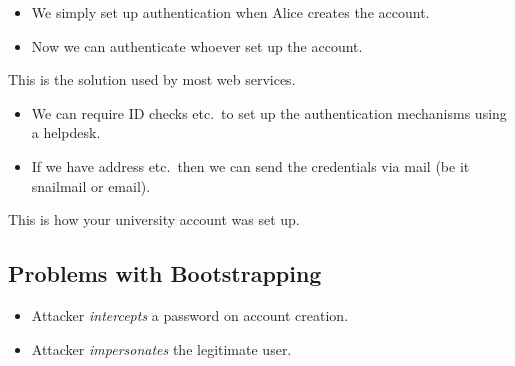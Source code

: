 \documentclass{beamer}
\begin{document}
\begin{frame}
  \begin{solution}
    \begin{itemize}
      \item We simply set up authentication when Alice creates the account.
      \item Now we can authenticate whoever set up the account.
    \end{itemize}
  \end{solution}

  \pause{}

  \begin{example}
    This is the solution used by most web services.
  \end{example}
\end{frame}

\begin{frame}
  \begin{solution}
    \begin{itemize}
      \item We can require ID checks etc.\ to set up the authentication 
        mechanisms using a helpdesk.

        \pause{}

      \item If we have address etc.\, then we can send the credentials via mail 
        (be it snailmail or email).

    \end{itemize}
  \end{solution}

  \pause{}

  \begin{example}
    This is how your university account was set up.
  \end{example}
\end{frame}


\subsection{Problems with Bootstrapping}

\begin{frame}
  \begin{itemize}
    \item Attacker \emph{intercepts} a password on account creation.
    \item Attacker \emph{impersonates} the legitimate user.
  \end{itemize}
\end{frame}
\end{document}
